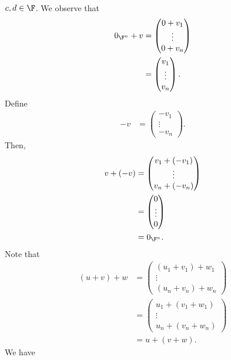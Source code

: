 \documentclass[12pt]{mypackage}
\begin{document}
\begin{example}[$\F^{n}$]
\begin{align*}
  \end{align*}
  $c,d\in \F$. We observe that
  \begin{align*}
    0_{\F^n} + v &= \begin{pmatrix}0 + v_1\\\vdots\\0 + v_n\end{pmatrix}\\
                 &= \begin{pmatrix}v_1\\\vdots\\v_n\end{pmatrix}.
  \end{align*}
  Define
  \begin{align*}
    -v &= \begin{pmatrix}-v_1\\\vdots\\-v_n\end{pmatrix}.
  \end{align*}
  Then,
  \begin{align*}
    v + (-v) &= \begin{pmatrix}v_1 + \left(-v_1\right)\\\vdots\\v_n + \left(-v_n\right)\end{pmatrix}\\
             &= \begin{pmatrix}0\\\vdots\\0\end{pmatrix}\\
             &= 0_{\F^n}.
  \end{align*}
  Note that
  \begin{align*}
    (u + v) + w &= \begin{pmatrix}\left(u_1 + v_1\right) + w_1 \\\vdots\\\left(u_n + v_n\right) + w_n\end{pmatrix}\\
                &= \begin{pmatrix}u_1 + \left(v_1 + w_1\right) \\\vdots\\u_n + \left(v_n + w_n\right)\end{pmatrix}\\
                &= u + (v+w).
  \end{align*}
  We have
  \begin{align*}

\end{align*}
\end{example}
\end{document}
